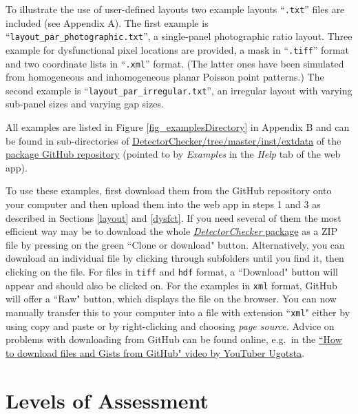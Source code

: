 \documentclass[11pt,a4paper]{article}
\newcommand{\DetectorChecker}{\emph{DetectorChecker}\xspace}
\begin{document}
To illustrate the use of user-defined layouts two example layouts ``\texttt{.txt}'' files are included (see Appendix A). 
The first example is ``\texttt{layout\_par\_photographic.txt}'',  a single-panel photographic ratio layout. Three example for dysfunctional pixel locations are provided, a mask in ``\texttt{.tiff}'' format and two coordinate lists in ``\texttt{.xml}'' format. (The latter ones have been simulated from homogeneous and inhomogeneous planar Poisson point patterns.)
The second example is ``\texttt{layout\_par\_irregular.txt}'', an irregular layout with varying sub-panel sizes and varying gap sizes. 

All examples are listed in Figure \ref{fig_examplesDirectory} in Appendix B and can be found in sub-directories of
\href{https://github.com/alan-turing-institute/DetectorChecker/tree/master/inst/extdata}{DetectorChecker/tree/master/inst/extdata} 
of the
\href{https://github.com/alan-turing-institute/DetectorChecker}{package GitHub repository}
(pointed to by \emph{Examples} in the \emph{Help} tab of the web app).

To use these examples, first download them from the GitHub repository onto your computer and then upload them into the web app in steps 1 and 3 as described in Sections \ref{layout} and \ref{dysfct}. If you need several of them the most efficient way may be to download the whole  \href{https://github.com/alan-turing-institute/DetectorChecker}{\DetectorChecker package}
as a ZIP file by pressing on the green ``Clone or download" button. Alternatively, you can download an individual file by clicking through subfolders until you find it, then clicking
on the file. 
For files in \texttt{tiff} and \texttt{hdf} format, 
a ``Download" button will appear and should also be clicked on. 
For the examples in \texttt{xml} format, GitHub will offer a ``Raw" button, 
which displays the file on the browser. 
You can now manually transfer this to your computer into a file with extension ``\texttt{xml}" either by using copy and paste or by right-clicking and choosing \emph{page source.} 
Advice on problems with downloading from GitHub can be found online, 
e.g.~in the
\href{https://youtu.be/GIJdfuAoqFI}{``How to download files and Gists from GitHub" video by YouTuber Ugotsta}.


\section{Levels of Assessment}\label{levels}
\end{document}
